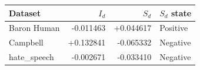 \begin{tabular}{lrrl}
\toprule
Dataset & $I_d$ & $S_d$ & $S_d$ state \\
\midrule
Baron Human & -0.011463 & +0.044617 & Positive \\
Campbell & +0.132841 & -0.065332 & Negative \\
hate\_speech & -0.002671 & -0.033410 & Negative \\
\bottomrule
\end{tabular}
